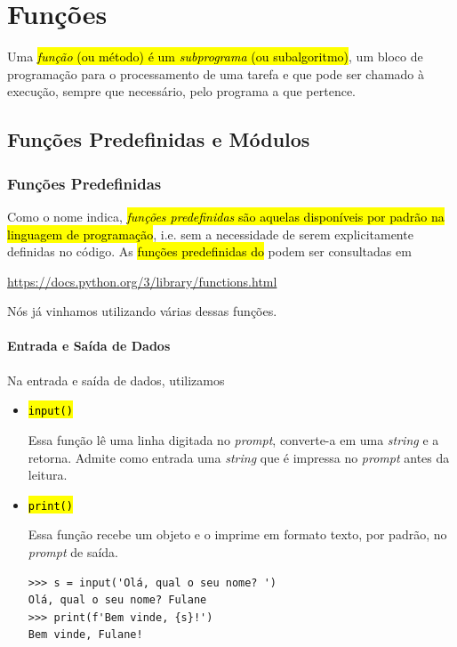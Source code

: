 
\chapter{Funções}\label{cap_fun}
\thispagestyle{fancy}

Uma \hl{\emph{função} (ou método) é um \emph{subprograma} (ou subalgoritmo)}, um bloco de programação para o processamento de uma tarefa e que pode ser chamado à execução, sempre que necessário, pelo programa a que pertence.

\section{Funções Predefinidas e Módulos}\label{cap_fun_sec_buildin}

\subsection{Funções Predefinidas}

Como o nome indica, \hl{\emph{funções predefinidas} são aquelas disponíveis por padrão na linguagem de programação}, i.e. sem a necessidade de serem explicitamente definidas no código. As \hl{funções predefinidas do {\python}} podem ser consultadas em
\begin{center}
  \url{https://docs.python.org/3/library/functions.html}
\end{center}

Nós já vinhamos utilizando várias dessas funções.

\subsubsection{Entrada e Saída de Dados}

Na entrada e saída de dados, utilizamos
\begin{itemize}
\item \hl{{\lstinline+input()+}}

  Essa função lê uma linha digitada no \textit{prompt}, converte-a em uma \textit{string} e a retorna. Admite como entrada uma \textit{string} que é impressa no \textit{prompt} antes da leitura.

\item \hl{{\lstinline+print()+}}

  Essa função recebe um objeto e o imprime em formato texto, por padrão, no \textit{prompt} de saída.

\begin{lstlisting}
>>> s = input('Olá, qual o seu nome? ')
Olá, qual o seu nome? Fulane
>>> print(f'Bem vinde, {s}!')
Bem vinde, Fulane!
\end{lstlisting}
\end{itemize}

